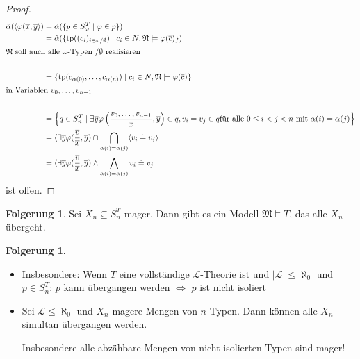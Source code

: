 \documentclass[12pt,parskip=full]{scrartcl}
\newcommand{\abs}[1]{{\left| #1 \right|}}
\theoremstyle{definition}
\newtheorem{corollary}[theorem]{Folgerung}
\begin{document}
\begin{proof}
		\begin{align*}
			\tilde{\alpha}(\langle \varphi(\overline{x}, \overline{y} \rangle ) &= \tilde{\alpha}(\{ p \in S_\omega^T \mid \varphi \in p \}) \\
			&= \tilde{\alpha}(\{ \operatorname{tp}((c_i)_{i \in \omega / \emptyset}) \mid c_i \in N, \mathfrak{N} \models \varphi(\overline{c}) \}) \\
			\intertext{$\mathfrak{N}$ soll auch alle $\omega$-Typen $/\emptyset$ realisieren} \\
			&= \{ \operatorname{tp}(c_{\alpha(0)}, \dots, c_{\alpha(n)}) \mid c_i \in N, \mathfrak{N} \models \varphi(\overline{c}) \} \\
			\intertext{in Variablen $v_0, \dots, v_{n-1}$} \\
			&= \left\{ q \in S_n^T \mid \exists \overline{y} \varphi\left( \frac{v_0, \dots, v_{n-1}}{\overline{x}} , \overline{y} \right) \in q, v_i = v_j \in q \text{für alle $0 \leq i < j < n$ mit $\alpha(i) = \alpha(j)$} \right\} \\
			&= \langle \exists \overline{y} \varphi(\frac{\overline{v}}{\overline{x}}, \overline{y}) \cap \bigcap_{\alpha(i) = \alpha(j)} \langle v_i \doteq v_j \rangle \\
			&= \langle \exists \overline{y} \varphi(\frac{\overline{v}}{\overline{x}}, \overline{y}) \land \bigwedge_{\alpha(i) = \alpha(j)} v_i \doteq v_j
		\end{align*}
		ist offen.
	
	\end{proof}

	\begin{corollary}
		Sei $X_n \subseteq S_n^T$ mager. Dann gibt es ein Modell $\mathfrak{M} \models T$, das alle $X_n$ übergeht.
	\end{corollary}

	\begin{corollary}
		\begin{itemize}
			\item Insbesondere: Wenn $T$ eine vollständige $\mathcal{L}$-Theorie ist und $\abs{\mathcal{L}} \leq \aleph_0$ und $p \in S_n^T$: $p$ kann übergangen werden $\Leftrightarrow$ $p$ ist nicht isoliert
			\item Sei $\mathcal{L} \leq \aleph_0$ und $X_n$ magere Mengen von $n$-Typen. Dann können alle $X_n$ simultan übergangen werden.
			
			Insbesondere alle abzähbare Mengen von nicht isolierten Typen sind mager!
		\end{itemize}
	\end{corollary}
\end{document}
